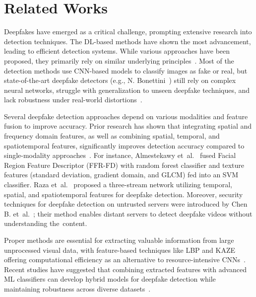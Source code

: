 \section{Related Works}
\label{sec:impact}

Deepfakes have emerged as a critical challenge, prompting extensive research into detection techniques. The DL-based methods have shown the most advancement, leading to efficient detection systems. While various approaches have been proposed, they primarily rely on similar underlying principles~\cite{idsl_survey1,https://doi.org/10.1002/widm.1520}. 
Most of the detection methods use CNN-based models to classify images as fake or real, but state-of-the-art deepfake detectors (e.g., N. Bonettini~\cite{9412711}) still rely on complex neural networks, struggle with generalization to unseen deepfake techniques, and lack robustness under real-world distortions~\cite{9412711, saberi2024robustness}.

Several deepfake detection approaches depend on various modalities and feature fusion to improve accuracy. Prior research has shown that integrating spatial and frequency domain features, as well as combining spatial, temporal, and spatiotemporal features, significantly improves detection accuracy compared to single-modality approaches~\cite{dong2023contrastive, raza2023holisticdfd, zhu2024high}. For instance, Almestekawy et~al.~\cite{ALMESTEKAWY2024100535} fused Facial Region Feature Descriptor (FFR-FD) with random forest classifier and texture features (standard deviation, gradient domain, and GLCM) fed into an SVM classifier. Raza et~al.~\cite{raza2023holisticdfd} proposed a three-stream network utilizing temporal, spatial, and spatiotemporal features for deepfake detection. Moreover, security techniques for deepfake detection on untrusted servers were introduced by Chen B. et~al.~\cite{chen2023privacy}; their method enables distant servers to detect deepfake videos without understanding the~\mbox{content}.

Proper methods are essential for extracting valuable information from large unprocessed visual data, with feature-based techniques like LBP and KAZE offering computational efficiency as an alternative to resource-intensive CNNs~\cite{app12178455}. Recent studies have suggested that combining extracted features with advanced ML classifiers can develop hybrid models for deepfake detection while maintaining robustness across diverse datasets~\cite{Huda2024, app12178455, 8346440}. 

